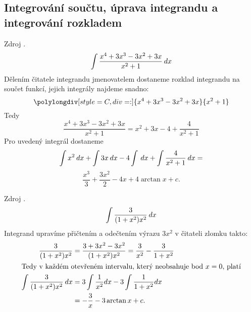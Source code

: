 {    \subsection{Integrování součtu, úprava integrandu a integrování rozkladem}
      \begin{example}
        Zdroj \cite[s.~29]{Knichal}.
        \begin{equation}\label{MA:int_ex_01}
          \int{\frac{x^4+3x^3-3x^2+3x}{x^2+1}\hspace{2pt}dx}
        \end{equation}
        Dělením čitatele integrandu jmenovatelem  dostaneme rozklad integrandu na součet funkcí,
        jejich integrály najdeme snadno:
         \begin{equation*} 
           \polylongdiv[style=C,div=:]{x^4+3x^3-3x^2+3x}{x^2+1}
         \end{equation*}
         Tedy
         \begin{equation*}
           \frac{x^4+3x^3-3x^2+3x}{x^2+1} = x^2+3x-4+\frac{4}{x^2+1}  
         \end{equation*}
         Pro uvedený integrál dostaneme
         \begin{equation*}
           \int{x^2}\hspace{2pt}dx+\int{3x}\hspace{2pt}dx-4\int\hspace{2pt}dx+\int{\frac{4}{x^2+1}\hspace{2pt}dx} =
         \end{equation*}
         \begin{equation*} 
             \frac{x^3}{3}+\frac{3x^2}{2}-4x+4\arctan x + c.
         \end{equation*}
      \end{example}
      
      \begin{example}
        Zdroj \cite[s.~29]{Knichal}.
        \begin{equation}\label{MA:int_ex_02}
          \int\frac{3}{(1+x^2)x^2}\hspace{2pt}dx
        \end{equation}
        Integrand upravíme přičtením a odečtením výrazu $3x^2$ v čitateli zlomku takto:
        \begin{align*}
          \frac{3}{(1+x^2)x^2} 
            &= \frac{3+3x^2-3x^2}{(1+x^2)x^2} = \frac{3}{x^2}-\frac{3}{1+x^2}                      \\  
          \intertext{Tedy v každém otevřeném intervalu, který neobsahuje bod \(x=0\), platí}
          \int{\frac{3}{(1+x^2)x^2}\hspace{2pt}dx} 
            &= 3\int{\frac{1}{x^2}dx} - 3\int{\frac{1}{1+x^2}dx}                                   \\
            &= -\frac{3}{x}-3\arctan x + c. 
        \end{align*}
      \end{example}
      
}
